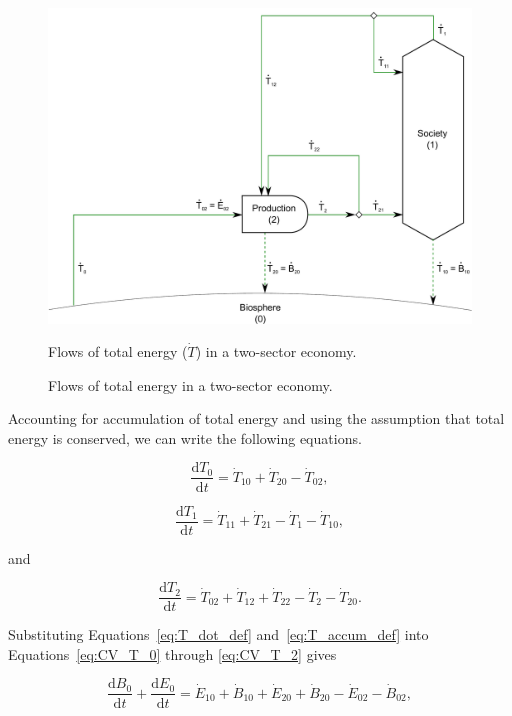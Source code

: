 \begin{figure}[!ht]
\includegraphics[width=0.9\linewidth]{Part_1/Chapter_Embodied/images/2_sector_embodied_energy.pdf}
\caption{Flows of total energy in a two-sector economy.}{Flows of total energy ($\dot{T}$) in a two-sector economy.}
\label{fig:B_total_energy}
\end{figure}

Accounting for accumulation of total energy and using the assumption 
that total energy is conserved, we can write the following equations.

\begin{equation} \label{eq:CV_T_0}
	\frac{\mathrm{d}T_{0}}{\mathrm{d}t} 	 
	= \dot{T}_{10} 
	+ \dot{T}_{20} 
	- \dot{T}_{02},
\end{equation}

\begin{equation} \label{eq:CV_T_1}
	\frac{\mathrm{d}T_{1}}{\mathrm{d}t} 	 
	= \dot{T}_{11}
	+ \dot{T}_{21} 
	- \dot{T}_{1}
	- \dot{T}_{10},
\end{equation}

\noindent and

\begin{equation} \label{eq:CV_T_2}
	\frac{\mathrm{d}T_{2}}{\mathrm{d}t} 	 
	= \dot{T}_{02} 
	+ \dot{T}_{12}
	+ \dot{T}_{22} 
	- \dot{T}_{2} 
	- \dot{T}_{20}.
\end{equation}

Substituting Equations~\ref{eq:T_dot_def} 
and~\ref{eq:T_accum_def} into 
Equations~\ref{eq:CV_T_0} through
\ref{eq:CV_T_2} gives

\begin{equation} \label{eq:CV_dB_0}
	\frac{\mathrm{d}B_{0}}{\mathrm{d}t} 
	+ \frac{\mathrm{d}E_{0}}{\mathrm{d}t} 
	= \dot{E}_{10} 
	+ \dot{B}_{10} 
	+ \dot{E}_{20} 
	+ \dot{B}_{20} 
	- \dot{E}_{02} 
	- \dot{B}_{02},
\end{equation}

